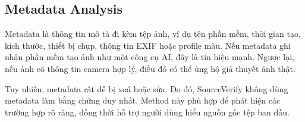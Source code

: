 \subsection{Metadata Analysis}
Metadata là thông tin mô tả đi kèm tệp ảnh, ví dụ tên phần mềm, thời gian tạo, kích thước, thiết bị chụp, thông tin EXIF hoặc profile màu. Nếu metadata ghi nhận phần mềm tạo ảnh như một công cụ AI, đây là tín hiệu mạnh. Ngược lại, nếu ảnh có thông tin camera hợp lý, điều đó có thể ủng hộ giả thuyết ảnh thật.

Tuy nhiên, metadata rất dễ bị xoá hoặc sửa. Do đó, SourceVerify không dùng metadata làm bằng chứng duy nhất. Method này phù hợp để phát hiện các trường hợp rõ ràng, đồng thời hỗ trợ người dùng hiểu nguồn gốc tệp ban đầu.
